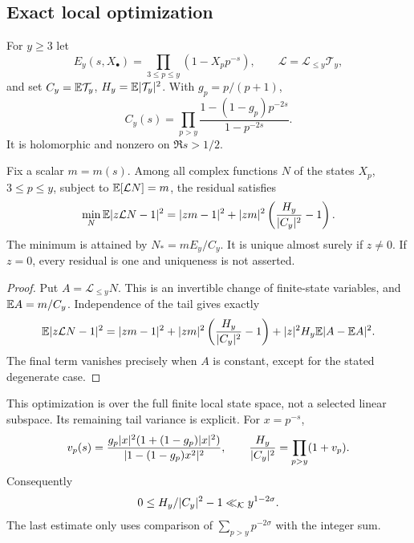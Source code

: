\subsection{Exact local optimization}
For $y\ge3$ let
\[
 E_y(s,X_\bullet)=\prod_{3\le p\le y}(1-X_pp^{-s}),\qquad
 \mathcal L=\mathcal L_{\le y}\mathcal T_y,
\]
and set $C_y=\mathbb E\mathcal T_y$, $H_y=\mathbb E\lvert\mathcal T_y\rvert^2$. With $g_p=p/(p+1)$,
\begin{equation}\label{eq:Cy}
 C_y(s)=\prod_{p>y}\frac{1-(1-g_p)p^{-2s}}{1-p^{-2s}}.
\end{equation}
It is holomorphic and nonzero on $\Re s>1/2$.

\begin{theorem}\label{thm:variance}
Fix a scalar $m=m(s)$. Among all complex functions $N$ of the states $X_p$, $3\le p\le y$, subject to $\mathbb E[\mathcal L N]=m$, the residual satisfies
\begin{equation}\label{eq:variance-min}
 \min_N\mathbb E\lvert z\mathcal L N-1\rvert^2
 =\lvert zm-1\rvert^2+\lvert zm\rvert^2\left(\frac{H_y}{\lvert C_y\rvert^2}-1\right).
\end{equation}
The minimum is attained by $N_*=mE_y/C_y$. It is unique almost surely if $z\ne0$. If $z=0$, every residual is one and uniqueness is not asserted.
\end{theorem}
\begin{proof}
Put $A=\mathcal L_{\le y}N$. This is an invertible change of finite-state variables, and $\mathbb E A=m/C_y$. Independence of the tail gives exactly
\begin{align*}
 \mathbb E\lvert z\mathcal L N-1\rvert^2
  =\lvert zm-1\rvert^2
   +\lvert zm\rvert^2\left(\frac{H_y}{\lvert C_y\rvert^2}-1\right)
   +\lvert z\rvert^2 H_y\mathbb E\lvert A-\mathbb E A\rvert^2.
\end{align*}
The final term vanishes precisely when $A$ is constant, except for the stated degenerate case.
\end{proof}

This optimization is over the full finite local state space, not a selected linear subspace. Its remaining tail variance is explicit. For $x=p^{-s}$,
\[
 v_p(s)=\frac{g_p\lvert x\rvert^2(1+(1-g_p)\lvert x\rvert^2)}
                  {\lvert1-(1-g_p)x^2\rvert^2},\qquad
 \frac{H_y}{\lvert C_y\rvert^2}=\prod_{p>y}(1+v_p).
\]
Consequently
\begin{equation}\label{eq:variance-tail}
 0\le H_y/\lvert C_y\rvert^2-1\ll_{\mathcal K}y^{1-2\sigma}.
\end{equation}
The last estimate only uses comparison of $\sum_{p>y}p^{-2\sigma}$ with the integer sum.


